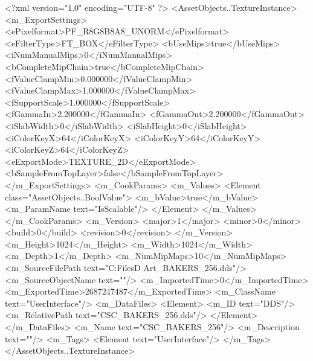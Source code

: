 <?xml version="1.0" encoding="UTF-8" ?>
<AssetObjects..TextureInstance>
	<m_ExportSettings>
		<ePixelformat>PF_R8G8B8A8_UNORM</ePixelformat>
		<eFilterType>FT_BOX</eFilterType>
		<bUseMips>true</bUseMips>
		<iNumManualMips>0</iNumManualMips>
		<bCompleteMipChain>true</bCompleteMipChain>
		<fValueClampMin>0.000000</fValueClampMin>
		<fValueClampMax>1.000000</fValueClampMax>
		<fSupportScale>1.000000</fSupportScale>
		<fGammaIn>2.200000</fGammaIn>
		<fGammaOut>2.200000</fGammaOut>
		<iSlabWidth>0</iSlabWidth>
		<iSlabHeight>0</iSlabHeight>
		<iColorKeyX>64</iColorKeyX>
		<iColorKeyY>64</iColorKeyY>
		<iColorKeyZ>64</iColorKeyZ>
		<eExportMode>TEXTURE_2D</eExportMode>
		<bSampleFromTopLayer>false</bSampleFromTopLayer>
	</m_ExportSettings>
	<m_CookParams>
		<m_Values>
			<Element class="AssetObjects..BoolValue">
				<m_bValue>true</m_bValue>
				<m_ParamName text="IsScalable"/>
			</Element>
		</m_Values>
	</m_CookParams>
	<m_Version>
		<major>1</major>
		<minor>0</minor>
		<build>0</build>
		<revision>0</revision>
	</m_Version>
	<m_Height>1024</m_Height>
	<m_Width>1024</m_Width>
	<m_Depth>1</m_Depth>
	<m_NumMipMaps>10</m_NumMipMaps>
	<m_SourceFilePath text="C:\Users\Shadow\Desktop\Working Files\2D Art\Quarters\Bakers\CSC_BAKERS_256.dds"/>
	<m_SourceObjectName text=""/>
	<m_ImportedTime>0</m_ImportedTime>
	<m_ExportedTime>2687247487</m_ExportedTime>
	<m_ClassName text="UserInterface"/>
	<m_DataFiles>
		<Element>
			<m_ID text="DDS"/>
			<m_RelativePath text="CSC_BAKERS_256.dds"/>
		</Element>
	</m_DataFiles>
	<m_Name text="CSC_BAKERS_256"/>
	<m_Description text=""/>
	<m_Tags>
		<Element text="UserInterface"/>
	</m_Tags>
</AssetObjects..TextureInstance>
